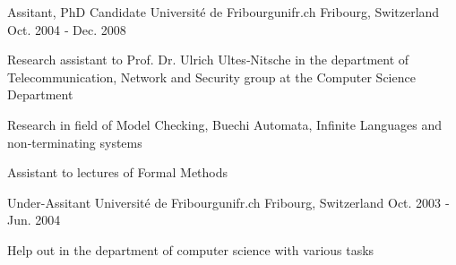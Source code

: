 \begin{cventries}
  \cventry
    {Assitant, PhD Candidate} %
    {Université de Fribourg{\enskip\cdotp\enskip}unifr.ch} %
    {Fribourg, Switzerland} %
    {Oct. 2004 ‑ Dec. 2008} %
    {
      \begin{cvitems} %
        \item {Research assistant to Prof. Dr. Ulrich Ultes‑Nitsche in the department of Telecommunication, Network and Security group at the Computer Science Department}
        \item {Research in field of Model Checking, Buechi Automata, Infinite Languages and non‑terminating systems}
        \item {Assistant to lectures of Formal Methods}
      \end{cvitems}
    }

  \cventry
    {Under-Assitant} %
    {Université de Fribourg{\enskip\cdotp\enskip}unifr.ch} %
    {Fribourg, Switzerland} %
    {Oct. 2003 ‑ Jun. 2004} %
    {
      \begin{cvitems} %
        \item {Help out in the department of computer science with various tasks}
      \end{cvitems}
    }
\end{cventries}
